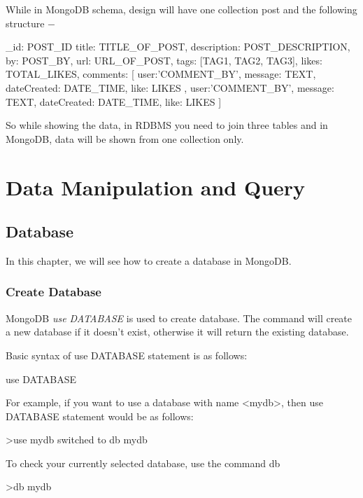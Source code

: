 \documentclass[12pt]{article}
\begin{document}
While in MongoDB schema, design will have one collection post and the following structure −

\begin{javascriptcode}
{
   _id: POST_ID
   title: TITLE_OF_POST,
   description: POST_DESCRIPTION,
   by: POST_BY,
   url: URL_OF_POST,
   tags: [TAG1, TAG2, TAG3],
   likes: TOTAL_LIKES,
   comments: [
      {
         user:'COMMENT_BY',
         message: TEXT,
         dateCreated: DATE_TIME,
         like: LIKES
      },
      {
         user:'COMMENT_BY',
         message: TEXT,
         dateCreated: DATE_TIME,
         like: LIKES
      }
   ]
}
\end{javascriptcode}

So while showing the data, in RDBMS you need to join three tables and in
MongoDB, data will be shown from one collection only.

\newpage
\section{Data Manipulation and Query}
\subsection{Database}

In this chapter, we will see how to create a database in MongoDB.

\subsubsection{Create Database}

MongoDB \emph{use DATABASE} is used to create database. The
command will create a new database if it doesn't exist, otherwise it
will return the existing database.

Basic syntax of use DATABASE statement is as follows:

\begin{bashcode}
use DATABASE
\end{bashcode}

For example, if you want to use a database with name <mydb>, then use
DATABASE statement would be as follows:

\begin{bashcode}
>use mydb
switched to db mydb
\end{bashcode}

To check your currently selected database, use the command db

\begin{bashcode}
>db
mydb
\end{bashcode}
\end{document}
